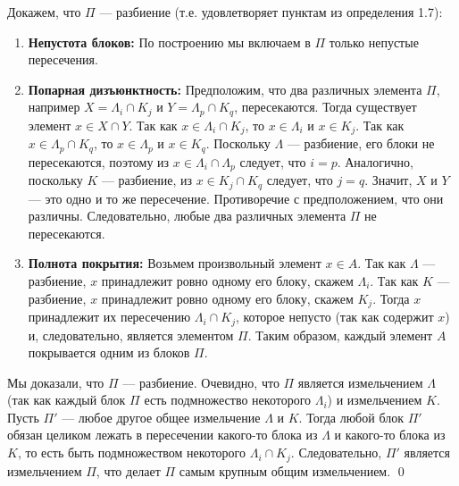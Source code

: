 \documentclass[a4paper,12pt]{article}
\begin{document}
Докажем, что $\Pi$ — разбиение (т.е. удовлетворяет пунктам из определения 1.7):
\begin{enumerate}
	\item \textbf{Непустота блоков:} По построению мы включаем в $\Pi$ только непустые пересечения.
	\item \textbf{Попарная дизъюнктность:} Предположим, что два различных элемента $\Pi$, например $X = \Lambda_i \cap K_j$ и $Y = \Lambda_p \cap K_q$, пересекаются. Тогда существует элемент $x \in X \cap Y$.
	Так как $x \in \Lambda_i \cap K_j$, то $x \in \Lambda_i$ и $x \in K_j$.
	Так как $x \in \Lambda_p \cap K_q$, то $x \in \Lambda_p$ и $x \in K_q$.
	Поскольку $\Lambda$ — разбиение, его блоки не пересекаются, поэтому из $x \in \Lambda_i \cap \Lambda_p$ следует, что $i = p$.
	Аналогично, поскольку $K$ — разбиение, из $x \in K_j \cap K_q$ следует, что $j = q$.
	Значит, $X$ и $Y$ — это одно и то же пересечение. Противоречие с предположением, что они различны. Следовательно, любые два различных элемента $\Pi$ не пересекаются.
	\item \textbf{Полнота покрытия:} Возьмем произвольный элемент $x \in A$. Так как $\Lambda$ — разбиение, $x$ принадлежит ровно одному его блоку, скажем $\Lambda_i$. Так как $K$ — разбиение, $x$ принадлежит ровно одному его блоку, скажем $K_j$. Тогда $x$ принадлежит их пересечению $\Lambda_i \cap K_j$, которое непусто (так как содержит $x$) и, следовательно, является элементом $\Pi$. Таким образом, каждый элемент $A$ покрывается одним из блоков $\Pi$.
\end{enumerate}
Мы доказали, что $\Pi$ — разбиение. Очевидно, что $\Pi$ является измельчением $\Lambda$ (так как каждый блок $\Pi$ есть подмножество некоторого $\Lambda_i$) и измельчением $K$. Пусть $\Pi'$ — любое другое общее измельчение $\Lambda$ и $K$. Тогда любой блок $\Pi'$ обязан целиком лежать в пересечении какого-то блока из $\Lambda$ и какого-то блока из $K$, то есть быть подмножеством некоторого $\Lambda_i \cap K_j$. Следовательно, $\Pi'$ является измельчением $\Pi$, что делает $\Pi$ самым крупным общим измельчением. \qed
\end{document}
